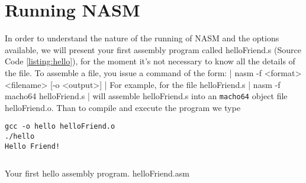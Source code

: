 \section{Running NASM}
\noindent In order to understand the nature of the running of NASM and the options available, we will present your first assembly program called helloFriend.s (Source Code \ref{listing:hello}), for the moment it's not necessary to know all the details of the file. To assemble a file, you issue a command of the form:
| nasm -f <format> <filename> [-o <output>] |
\noindent For example, for the file helloFriend.s
| nasm -f macho64 helloFriend.s |
\noindent will assemble helloFriend.s into an \texttt{macho64} object file helloFriend.o. Than to compile and execute the program we type
\begin{verbatim}
gcc -o hello helloFriend.o
./hello
Hello Friend!
\end{verbatim}

\begin{listing}[ht]
\inputminted{nasm}{code/helloFriend.asm}
\caption{Your first hello assembly program. helloFriend.asm}
\label{listing:hello}
\end{listing}

